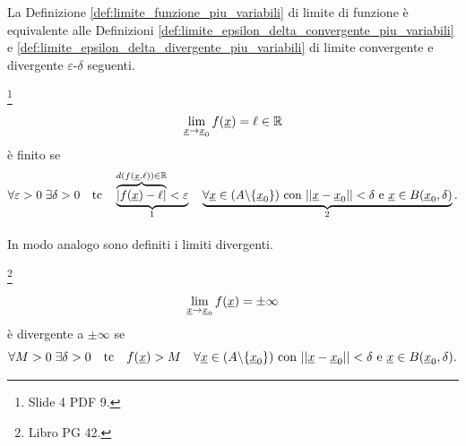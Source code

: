 La Definizione \ref{def:limite_funzione_piu_variabili} di limite di funzione è equivalente alle Definizioni \ref{def:limite_epsilon_delta_convergente_piu_variabili} e \ref{def:limite_epsilon_delta_divergente_piu_variabili} di limite convergente e divergente $\varepsilon$-$\delta$ seguenti.

\begin{definition}\label{def:limite_epsilon_delta_convergente_piu_variabili}\footnote{Slide 4 PDF 9.}
    \begin{equation*}
        \lim_{\uline x\rightarrow\uline x_0}f(\uline x)=\ell\in\mathbb R
    \end{equation*}
    è finito se
    \begin{equation}
        \forall\varepsilon>0\;\exists\delta>0\quad\text{tc}\quad \underbrace{\overbrace{|f(\uline x)-\ell|}^{d(f(\uline x,\ell))\in\mathbb R}<\varepsilon}_{\footnotemark}\quad \underbrace{\forall\uline x\in(A\backslash\{\uline x_0\}) \text{ con } ||\uline x-\uline x_0||<\delta \text{ e } \uline x\in B(\uline x_0,\delta)}_{\footnotemark}.
    \end{equation}
\end{definition}

\addtocounter{footnote}{-1}


In modo analogo sono definiti i limiti divergenti.
\begin{definition}\label{def:limite_epsilon_delta_divergente_piu_variabili}\footnote{Libro PG 42.}
    \begin{equation*}
        \lim_{\uline x\rightarrow\uline x_0}f(\uline x)=\pm\infty
    \end{equation*}
    è divergente a $\pm\infty$ se
    \begin{equation}\label{eq:limite_epsilon_delta_divergente_piu_variabili}
        \forall M>0\;\exists\delta>0\quad\text{tc}\quad f(\uline x)>M \quad \forall\uline x\in(A\backslash\{\uline x_0\}) \text{ con } ||\uline x-\uline x_0||<\delta \text{ e } \uline x\in B(\uline x_0,\delta).
    \end{equation}
\end{definition}

